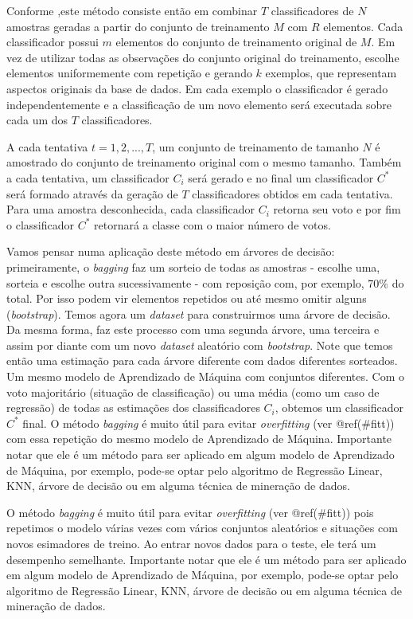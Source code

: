\documentclass[
  openany]{book}
\begin{document}
Conforme \citep{oshiro2013abordagem},este método consiste então em combinar \(T\) classificadores de \(N\) amostras geradas a partir do conjunto de treinamento \(M\) com \(R\) elementos. Cada classificador possui \(m\) elementos do conjunto de treinamento original de \(M\). Em vez de utilizar todas as observações do conjunto original do treinamento, escolhe elementos uniformemente com repetição e gerando \(k\) exemplos, que representam aspectos originais da base de dados. Em cada exemplo o classificador é gerado independentemente e a classificação de um novo elemento será executada sobre cada um dos \(T\) classificadores.

A cada tentativa \(t=1,2,...,T\), um conjunto de treinamento de tamanho \(N\) é amostrado do conjunto de treinamento original com o mesmo tamanho. Também a cada tentativa, um classificador \(C_i\) será gerado e no final um classificador \(C^*\) será formado através da geração de \(T\) classificadores obtidos em cada tentativa. Para uma amostra desconhecida, cada classificador \(C_i\) retorna seu voto e por fim o classificador \(C^*\) retornará a classe com o maior número de votos.

Vamos pensar numa aplicação deste método em árvores de decisão: primeiramente, o \emph{bagging} faz um sorteio de todas as amostras - escolhe uma, sorteia e escolhe outra sucessivamente - com reposição com, por exemplo, 70\% do total. Por isso podem vir elementos repetidos ou até mesmo omitir alguns (\emph{bootstrap}). Temos agora um \emph{dataset} para construirmos uma árvore de decisão. Da mesma forma, faz este processo com uma segunda árvore, uma terceira e assim por diante com um novo \emph{dataset} aleatório com \emph{bootstrap}. Note que temos então uma estimação para cada árvore diferente com dados diferentes sorteados. Um mesmo modelo de Aprendizado de Máquina com conjuntos diferentes. Com o voto majoritário (situação de classificação) ou uma média (como um caso de regressão) de todas as estimações dos classificadores \(C_i\), obtemos um classificador \(C^*\) final. O método \emph{bagging} é muito útil para evitar \emph{overfitting} (ver @ref(\#fitt)) com essa repetição do mesmo modelo de Aprendizado de Máquina. Importante notar que ele é um método para ser aplicado em algum modelo de Aprendizado de Máquina, por exemplo, pode-se optar pelo algoritmo de Regressão Linear, KNN, árvore de decisão ou em alguma técnica de mineração de dados.

O método \emph{bagging} é muito útil para evitar \emph{overfitting} (ver @ref(\#fitt)) pois repetimos o modelo várias vezes com vários conjuntos aleatórios e situações com novos esimadores de treino. Ao entrar novos dados para o teste, ele terá um desempenho semelhante. Importante notar que ele é um método para ser aplicado em algum modelo de Aprendizado de Máquina, por exemplo, pode-se optar pelo algoritmo de Regressão Linear, KNN, árvore de decisão ou em alguma técnica de mineração de dados.
\end{document}

